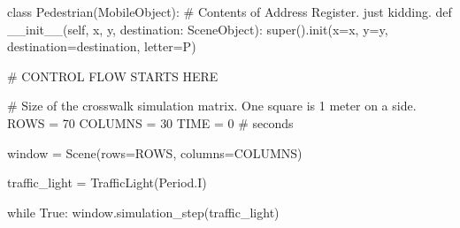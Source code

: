 \documentclass[
  letterpaper,
  DIV=11,
  numbers=noendperiod]{scrartcl}
\newenvironment{Shaded}{\begin{snugshade}}{\end{snugshade}}
\newcommand{\BuiltInTok}[1]{\textcolor[rgb]{0.00,0.23,0.31}{#1}}
\newcommand{\CommentTok}[1]{\textcolor[rgb]{0.37,0.37,0.37}{#1}}
\newcommand{\ControlFlowTok}[1]{\textcolor[rgb]{0.00,0.23,0.31}{#1}}
\newcommand{\DecValTok}[1]{\textcolor[rgb]{0.68,0.00,0.00}{#1}}
\newcommand{\FunctionTok}[1]{\textcolor[rgb]{0.28,0.35,0.67}{#1}}
\newcommand{\KeywordTok}[1]{\textcolor[rgb]{0.00,0.23,0.31}{#1}}
\newcommand{\NormalTok}[1]{\textcolor[rgb]{0.00,0.23,0.31}{#1}}
\newcommand{\OperatorTok}[1]{\textcolor[rgb]{0.37,0.37,0.37}{#1}}
\newcommand{\StringTok}[1]{\textcolor[rgb]{0.13,0.47,0.30}{#1}}
\newcommand{\VariableTok}[1]{\textcolor[rgb]{0.07,0.07,0.07}{#1}}
\begin{document}
\begin{Shaded}
\begin{Highlighting}[]
\KeywordTok{class}\NormalTok{ Pedestrian(MobileObject): }\CommentTok{\# Contents of Address Register. just kidding.}
    \KeywordTok{def} \FunctionTok{\_\_init\_\_}\NormalTok{(}\VariableTok{self}\NormalTok{, x, y, destination: SceneObject):}
        \BuiltInTok{super}\NormalTok{().init(x}\OperatorTok{=}\NormalTok{x, y}\OperatorTok{=}\NormalTok{y, destination}\OperatorTok{=}\NormalTok{destination, letter}\OperatorTok{=}\StringTok{\textquotesingle{}P\textquotesingle{}}\NormalTok{)}

\CommentTok{\# CONTROL FLOW STARTS HERE}

\CommentTok{\# Size of the crosswalk simulation matrix. One square is 1 meter on a side.}
\NormalTok{ROWS }\OperatorTok{=} \DecValTok{70}
\NormalTok{COLUMNS }\OperatorTok{=} \DecValTok{30}
\NormalTok{TIME }\OperatorTok{=} \DecValTok{0} \CommentTok{\# seconds}

\NormalTok{window }\OperatorTok{=}\NormalTok{ Scene(rows}\OperatorTok{=}\NormalTok{ROWS, columns}\OperatorTok{=}\NormalTok{COLUMNS)}

\NormalTok{traffic\_light }\OperatorTok{=}\NormalTok{ TrafficLight(Period.I)}

\ControlFlowTok{while} \VariableTok{True}\NormalTok{:}
\NormalTok{    window.simulation\_step(traffic\_light)}
\end{Highlighting}
\end{Shaded}
\end{document}
